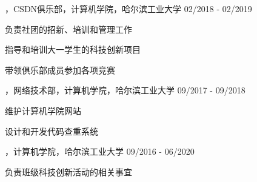 
\begin{cventries}

\cvexperience
{，CSDN俱乐部，计算机学院，哈尔滨工业大学}
{02/2018 - 02/2019}
{
    \begin{cvitems}
    \item {负责社团的招新、培训和管理工作}
    \item {指导和培训大一学生的科技创新项目}
    \item {带领俱乐部成员参加各项竞赛}
    \end{cvitems}
}

\cvexperience
{，网络技术部，计算机学院，哈尔滨工业大学}
{09/2017 - 09/2018}
{
    \begin{cvitems}
    \item {维护计算机学院网站}
    \item {设计和开发代码查重系统}
    \end{cvitems}
}

\cvexperience
{，计算机学院，哈尔滨工业大学}
{09/2016 - 06/2020}
{
    \begin{cvitems}
    \item {负责班级科技创新活动的相关事宜}
    \end{cvitems}
}

\end{cventries}